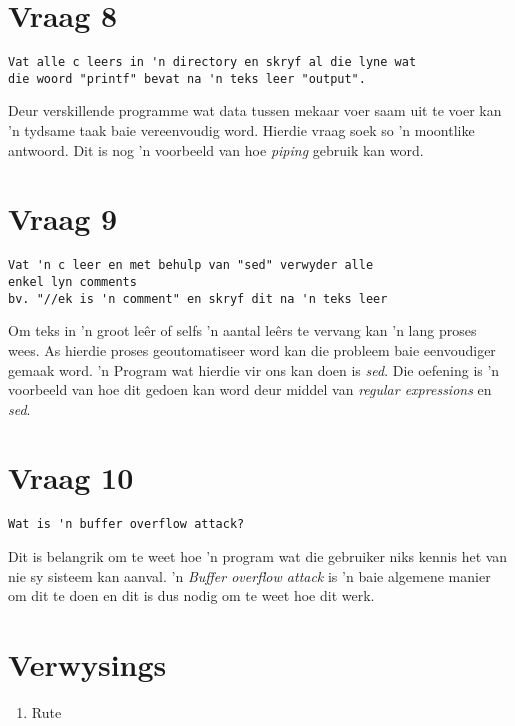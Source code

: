 \documentclass[a4paper,11pt,titlepage]{article}
\begin{document}
\section{Vraag 8}
\begin{verbatim}
Vat alle c leers in 'n directory en skryf al die lyne wat 
die woord "printf" bevat na 'n teks leer "output".
\end{verbatim}
Deur verskillende programme wat data tussen mekaar voer saam uit te voer kan 'n tydsame taak baie vereenvoudig word. Hierdie vraag soek so 'n moontlike antwoord. Dit is nog 'n voorbeeld van hoe \emph{piping} gebruik kan word.
\section{Vraag 9}
\begin{verbatim}
Vat 'n c leer en met behulp van "sed" verwyder alle 
enkel lyn comments 
bv. "//ek is 'n comment" en skryf dit na 'n teks leer
\end{verbatim}
Om teks in 'n groot le\^er of selfs 'n aantal le\^ers te vervang kan 'n lang proses wees. As hierdie proses geoutomatiseer word kan die probleem baie eenvoudiger gemaak word. 'n Program wat hierdie vir ons kan doen is \emph{sed}. Die oefening is 'n voorbeeld van hoe dit gedoen kan word deur middel van \emph{regular expressions} en \emph{sed}.
\section{Vraag 10}
\begin{verbatim}
Wat is 'n buffer overflow attack?
\end{verbatim}
Dit is belangrik om te weet hoe 'n program wat die gebruiker niks kennis het van nie sy sisteem kan aanval. 'n \emph{Buffer overflow attack} is 'n baie algemene manier om dit te doen en dit is dus nodig om te weet hoe dit werk.
\section{Verwysings}
\begin{enumerate}
\item Rute
\end{enumerate}
\end{document}
